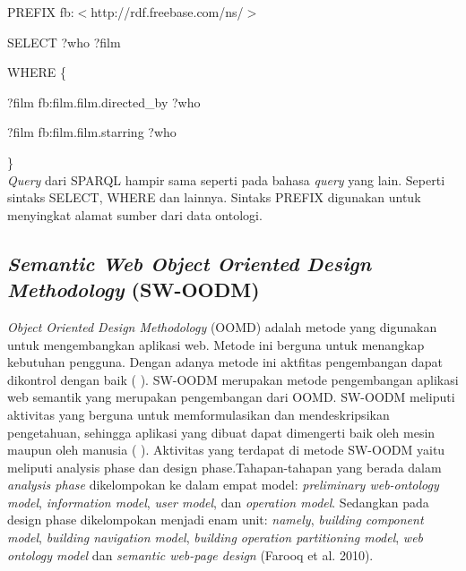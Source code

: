 PREFIX fb:$<$http://rdf.freebase.com/ns/$>$

SELECT ?who ?film

WHERE \{

?film fb:film.film.directed\_by ?who

?film fb:film.film.starring ?who

\}
\\

\textit{Query} dari SPARQL hampir sama seperti pada bahasa \textit{query} yang lain. Seperti sintaks SELECT, WHERE dan lainnya. Sintaks PREFIX digunakan untuk menyingkat alamat sumber dari data ontologi.

\subsection*{\textit{Semantic Web Object Oriented Design Methodology} (SW-OODM)}

\textit{Object Oriented Design Methodology} (OOMD) adalah metode yang digunakan untuk mengembangkan aplikasi web. Metode ini berguna untuk menangkap kebutuhan pengguna. Dengan adanya metode ini aktfitas pengembangan dapat dikontrol dengan baik (\citeauthor{FAROOQA2010} \cite*{FAROOQA2010}). SW-OODM merupakan metode pengembangan aplikasi web semantik yang merupakan pengembangan dari OOMD. SW-OODM meliputi aktivitas yang berguna untuk memformulasikan dan mendeskripsikan pengetahuan, sehingga aplikasi yang dibuat dapat dimengerti baik oleh mesin maupun oleh manusia (\citeauthor{FAROOQA2010} \cite*{FAROOQA2010}). Aktivitas yang terdapat di metode SW-OODM yaitu meliputi analysis phase dan design phase.Tahapan-tahapan yang berada dalam \textit{analysis phase} dikelompokan ke dalam empat model: \textit{preliminary web-ontology model}, \textit{information model}, \textit{user model}, dan \textit{operation model}. Sedangkan pada design phase dikelompokan menjadi enam unit: \textit{namely}, \textit{building component model}, \textit{building navigation model}, \textit{building operation partitioning model}, \textit{web ontology model} dan \textit{semantic web-page design} (Farooq et al. 2010).

